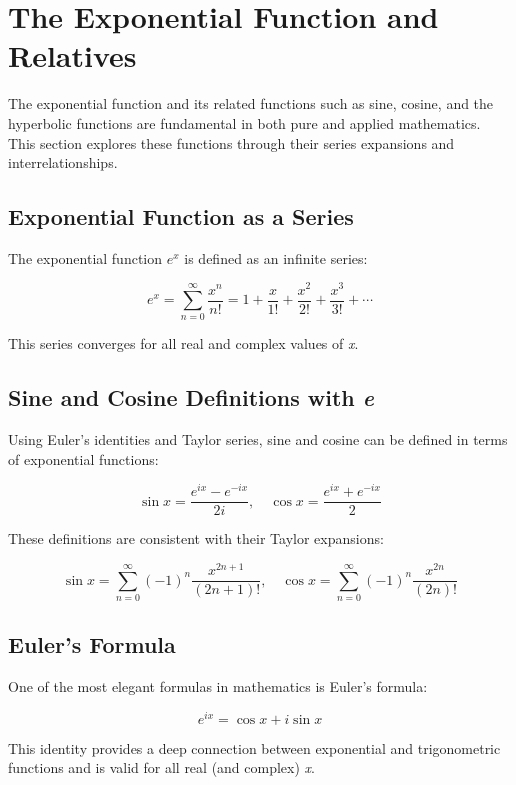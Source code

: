 \newpage
\section{The Exponential Function and Relatives}

The exponential function and its related functions such as sine, cosine, and the hyperbolic functions 
are fundamental in both pure and applied mathematics. This section explores these functions through their 
series expansions and interrelationships.

\subsection{Exponential Function as a Series}

The exponential function \(e^x\) is defined as an infinite series:

\[
    e^x = \sum_{n=0}^{\infty} \frac{x^n}{n!}
    = 1 + \frac{x}{1!} + \frac{x^2}{2!} + \frac{x^3}{3!} + \cdots
\]

This series converges for all real and complex values of \emph{x}.

\subsection{Sine and Cosine Definitions with \texorpdfstring{\emph{e}}{e}}

Using Euler's identities and Taylor series, sine and cosine can be defined in terms of exponential 
functions:

\[
    \sin x = \frac{e^{ix} - e^{-ix}}{2i}, \quad
    \cos x = \frac{e^{ix} + e^{-ix}}{2}
\]

These definitions are consistent with their Taylor expansions:

\[
    \sin x = \sum_{n=0}^{\infty} {(-1)}^n \frac{x^{2n+1}}{(2n+1)!}, \quad
    \cos x = \sum_{n=0}^{\infty} {(-1)}^n \frac{x^{2n}}{(2n)!}
\]

\subsection{Euler's Formula}

One of the most elegant formulas in mathematics is Euler’s formula:

\[
    e^{ix} = \cos x + i\sin x
\]

This identity provides a deep connection between exponential and trigonometric functions and is valid 
for all real (and complex) \emph{x}.
\vspace{\baselineskip}


